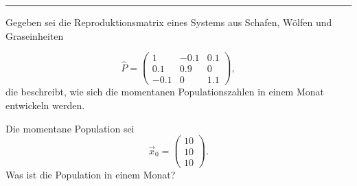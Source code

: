 



  \sheet[%
  number=3,
  topic={Matrixrechnereien und effektiver Widerstand},
    ]


\vspace{-1cm}
\noindent\rule{12cm}{0.4pt}

  \exercise[%
  topic = Matrixmultiplikation
  ]
  Gegeben sei die Reproduktionsmatrix eines Systems aus Schafen,
  W\"olfen und Graseinheiten

  \begin{equation}
      \hat P = 
      \left(
      \begin{matrix}
          1    & -0.1   & 0.1 \\
          0.1  & 0.9 & 0 \\
          -0.1 & 0   & 1.1 
      \end{matrix}
  \right),
   \end{equation}
   die beschreibt, wie sich die momentanen Populationszahlen in einem
   Monat entwickeln werden.
   
 \subexercise[%
  topic={Populationsentwicklung},
    ]

   Die momentane Population sei
   \begin{equation}
       \label{eq:equalpop}
       \vec x_0 = \left(\begin{matrix}
               10\\
               10\\
               10
           \end{matrix}\right).
   \end{equation}
   Was ist die Population in einem Monat?

